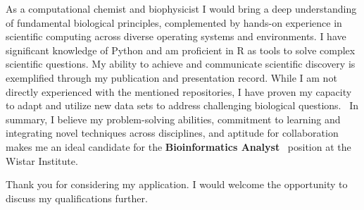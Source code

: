 \documentclass[11pt, a4paper]{awesome-cv}
\newcommand{\companyname}{Wistar Institute}
\newcommand{\role}{Bioinformatics Analyst}
\newcommand{\brole}{\textbf{\role}}
\begin{document}
\begin{cvletter}
		As a computational chemist and biophysicist I would bring a deep understanding of fundamental biological principles, complemented by hands-on experience in scientific computing across diverse operating systems and environments. %
		I have significant knowledge of Python and am proficient in R as tools to solve complex scientific questions. %
		My ability to achieve and communicate scientific discovery is exemplified through my publication and presentation record. %
		While I am not directly experienced with the mentioned repositories, I have proven my capacity to adapt and utilize new data sets to address challenging biological questions.%
		~In summary, I believe my problem-solving abilities, commitment to learning and integrating novel techniques across disciplines, and aptitude for collaboration makes me an ideal candidate for the \brole~ position at the \companyname.
	\end{cvletter}

	Thank you for considering my application. I would welcome the opportunity to discuss my qualifications further.
	\newline
	~\newline
	\makeletterclosing	
\end{document}
